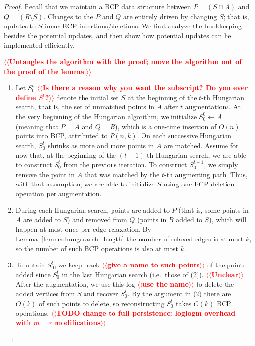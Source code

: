 \documentclass[a4paper,UKenglish]{socg-lipics-v2018}
\makeatletter
\def\note#1{\textcolor{red}{{#1}}}
\theoremstyle{plain}
\numberwithin{figure}{section}
\def\n@te#1{\textsf{\boldmath \textbf{$\langle\!\langle$#1$\rangle\!\rangle$}}\leavevmode}
\def\note#1{\textcolor{red}{\n@te{#1}}}
\makeatother
\begin{document}
\begin{proof}
Recall that we maintain a BCP data structure between $P = (S \cap A)$ and
$Q = (B \setminus S)$.
Changes to the $P$ and $Q$ are entirely driven by changing $S$; that is,
updates to $S$ incur BCP insertions/deletions.
We first analyze the bookkeeping besides the potential updates, and then
show how potential updates can be implemented efficiently.

\note{Untangles the algorithm with the proof; move the algorithm out of the proof of the lemma.}

\begin{enumerate}
\item Let $S^t_0$ \note{Is there a reason why you want the subscript?  Do you ever define $S^t$?} denote the initial set $S$ at the beginning of the
	$t$-th Hungarian search, that is, the set of unmatched points in $A$
	after $t$ augmentations.
	At the very beginning of the Hungarian algorithm, we initialize
	$S^0_0 \gets A$ (meaning that $P = A$ and $Q = B$), which is a
	one-time insertion of $O(n)$ points into BCP, attributed to $P(n, k)$.
	On each successive Hungarian search, $S^t_0$ shrinks as more
	and more points in $A$ are matched.
	Assume for now that, at the beginning of the $(t+1)$-th
	Hungarian search, we are able to construct $S^t_0$ from the
	previous iteration.
	To construct $S^{t+1}_0$, we simply remove the point in $A$ that was
	matched by the $t$-th augmenting path.
	Thus, with that assumption, we are able to initialize $S$ using
	one BCP deletion operation per augmentation.

\item During each Hungarian search, points are added to $P$ (that is, some points in $A$ are
	added to $S$) and removed from $Q$ (points in $B$ added to $S$), which will happen at most once per edge relaxation.
	By Lemma~\ref{lemma:hungsearch_length} the number of relaxed
	edges is at most $k$, so the number of such BCP operations is
	also at most $k$.

\item To obtain $S^t_0$, we keep track \note{give a name to such points} of the
	points added since $S^t_0$ in the last Hungarian search
	(i.e.\ those of (2)). \note{Unclear}
	After the augmentation, we use this log \note{use the name} to delete the added
	vertices from $S$ and recover $S^t_0$.
	By the argument in (2) there are $O(k)$ of such points to
	delete, so reconstructing $S^t_0$ takes $O(k)$ BCP operations.
	\note{TODO change to full persistence: loglogm overhead with $m=r$ modifications} %
\end{enumerate}


\end{proof}
\end{document}
